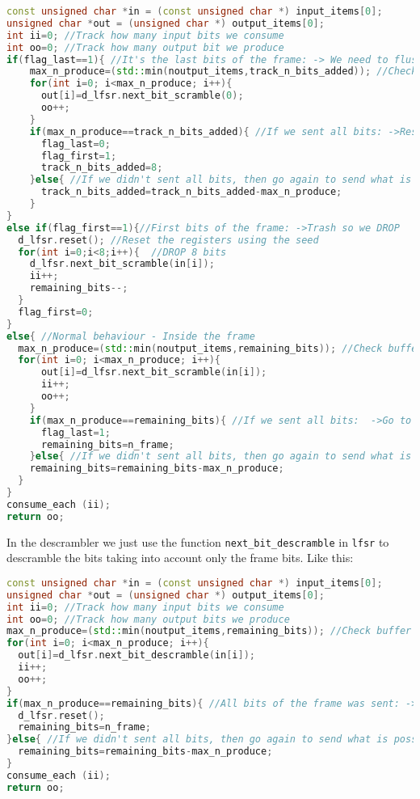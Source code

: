 \documentclass[a4paper, 10pt, conference]{ieeeconf}      %
\begin{document}
\begin{lstlisting}[language=c++, breaklines]
const unsigned char *in = (const unsigned char *) input_items[0];
unsigned char *out = (unsigned char *) output_items[0];
int ii=0; //Track how many input bits we consume
int oo=0; //Track how many output bit we produce
if(flag_last==1){ //It's the last bits of the frame: -> We need to flush it
    max_n_produce=(std::min(noutput_items,track_n_bits_added)); //Check buffer to the amount of bits that we can scramble
    for(int i=0; i<max_n_produce; i++){
      out[i]=d_lfsr.next_bit_scramble(0);
      oo++;
    }
    if(max_n_produce==track_n_bits_added){ //If we sent all bits: ->Reset variables ->Go to the first bits branch
      flag_last=0; 
      flag_first=1;
      track_n_bits_added=8;
    }else{ //If we didn't sent all bits, then go again to send what is possible. 
      track_n_bits_added=track_n_bits_added-max_n_produce;
    }
}
else if(flag_first==1){//First bits of the frame: ->Trash so we DROP
  d_lfsr.reset(); //Reset the registers using the seed
  for(int i=0;i<8;i++){  //DROP 8 bits
    d_lfsr.next_bit_scramble(in[i]);
    ii++;
    remaining_bits--;
  }
  flag_first=0;
}
else{ //Normal behaviour - Inside the frame
  max_n_produce=(std::min(noutput_items,remaining_bits)); //Check buffer to the amount of bits that we can scramble
  for(int i=0; i<max_n_produce; i++){
      out[i]=d_lfsr.next_bit_scramble(in[i]);
      ii++;
      oo++;
    }
    if(max_n_produce==remaining_bits){ //If we sent all bits:  ->Go to last branch to flush ->Reset variables
      flag_last=1;
      remaining_bits=n_frame;
    }else{ //If we didn't sent all bits, then go again to send what is possible. 
    remaining_bits=remaining_bits-max_n_produce;
  }
}
consume_each (ii);
return oo;
\end{lstlisting}
    
    In the descrambler we just use the function \verb|next_bit_descramble| in \verb|lfsr| to descramble the bits taking into account only the frame bits. Like this:
    

\begin{lstlisting}[language=c++, breaklines]
const unsigned char *in = (const unsigned char *) input_items[0];
unsigned char *out = (unsigned char *) output_items[0];
int ii=0; //Track how many input bits we consume
int oo=0; //Track how many output bits we produce
max_n_produce=(std::min(noutput_items,remaining_bits)); //Check buffer to the amount of bits that we can descramble
for(int i=0; i<max_n_produce; i++){
  out[i]=d_lfsr.next_bit_descramble(in[i]);
  ii++;
  oo++;
}
if(max_n_produce==remaining_bits){ //All bits of the frame was sent: ->Reset registers with seed ->Reset variables
  d_lfsr.reset();
  remaining_bits=n_frame;
}else{ //If we didn't sent all bits, then go again to send what is possible. 
  remaining_bits=remaining_bits-max_n_produce;
}    
consume_each (ii);
return oo;
\end{lstlisting}   
\end{document}
